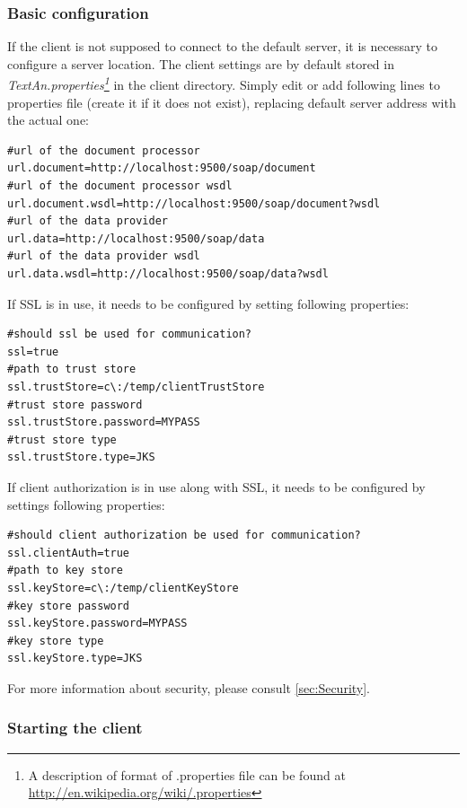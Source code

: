 \documentclass[12pt,a4paper]{report}
\begin{document}
\subsubsection{Basic configuration}
\label{sssec:BasicConf}

If the client is not supposed to connect to the default server, it is necessary
to configure a server location. The client settings are by default stored in \emph{TextAn.properties\footnote{A description of format of .properties file can be found at \url{http://en.wikipedia.org/wiki/.properties}}}
in the client directory. Simply edit or add following lines to properties file
(create it if it does not exist), replacing default server address with the
actual one:
\begin{lstlisting}[frame=single,language=properties]
#url of the document processor
url.document=http://localhost:9500/soap/document
#url of the document processor wsdl
url.document.wsdl=http://localhost:9500/soap/document?wsdl
#url of the data provider
url.data=http://localhost:9500/soap/data
#url of the data provider wsdl
url.data.wsdl=http://localhost:9500/soap/data?wsdl
\end{lstlisting}

If SSL is in use, it needs to be configured by setting following properties:
\begin{lstlisting}[frame=single,language=properties]
#should ssl be used for communication?
ssl=true
#path to trust store
ssl.trustStore=c\:/temp/clientTrustStore
#trust store password
ssl.trustStore.password=MYPASS
#trust store type
ssl.trustStore.type=JKS
\end{lstlisting}

If client authorization is in use along with SSL, it needs to be configured
by settings following properties:
\begin{lstlisting}[frame=single,language=properties]
#should client authorization be used for communication?
ssl.clientAuth=true
#path to key store
ssl.keyStore=c\:/temp/clientKeyStore
#key store password
ssl.keyStore.password=MYPASS
#key store type
ssl.keyStore.type=JKS
\end{lstlisting}

For more information about security, please consult \ref{sec:Security}.

\subsubsection{Starting the client}
\label{sssec:StartClient}
\end{document}
